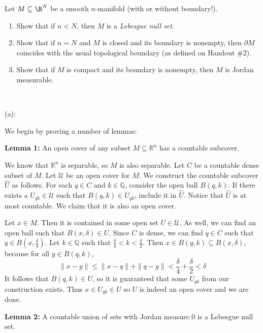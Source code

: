 \documentclass{../../../tex-setup/eh-homework}
\begin{document}
    \begin{question}{42}
        Let $M\subseteq \R^N$ be a smooth $n$-manifold (with or without boundary!).
        \begin{enumerate}[label=(\alph*)]
            \item Show that if $n<N$, then $M$ is a \textit{Lebesgue null set}.

            \item Show that if $n=N$ and $M$ is closed and its boundary is nonempty, then $\partial M$ coincides with the usual topological boundary (as defined on Handout \#2).

            \item Show that if $M$ is compact and its boundary is nonempty, then $M$ is Jordan measurable.
        \end{enumerate}
        \tcblower
        \ 

        (a):

        We begin by proving a number of lemmas:

        \textbf{Lemma 1:} An open cover of any subset \(M \subseteq \mathbb{R}^n\) has a countable subcover.

        We know that \(\mathbb{R}^n\) is separable, so \(M\) is also separable. Let \(C\) be a countable dense subset of \(M\). Let \(\mathcal{U}\) be an open cover for \(M\). We construct the countable subcover \(\hat{U}\) as follows. For each \(q \in C\) and \(k \in \mathbb{Q}\), consider the open ball \(B(q, k)\). If there exists a \(U_{qk} \in \mathcal{U}\) such that \(B(q , k) \in U_{qk}\), include it in \(\hat{U}\). Notice that \(\hat{U}\) is at most countable. We claim that it is also an open cover.

        Let \(x \in M\). Then it is contained in some open set \(U \in \mathcal{U}\). As well, we can find an open ball such that \(B(x, \delta) \in U\). Since \(C\) is dense, we can find \(q \in C\) such that \(q \in B(x, \frac{\delta}{4})\). Let \(k \in \mathbb{Q}\) such that \(\frac{\delta}{4} < k < \frac{\delta}{2}\). Then \(x \in B(q, k) \subseteq B(x, \delta)\), because for all \(y \in B(q,k)\),
        \[
            \|x - y\| \leq \|x - q\| + \|q - y\| < \frac{\delta}{4} + \frac{\delta}{2} < \delta
        \]
        It follows that \(B(q,k) \in U\), so it is guaranteed that some \(U_{qk}\) from our construction exists. Thus \(x \in U_{qk} \in U\) so \(U\) is indeed an open cover and we are done.

        \medskip

        \textbf{Lemma 2:} A countable union of sets with Jordan measure 0 is a Lebesgue null set.


\end{question}
\end{document}
